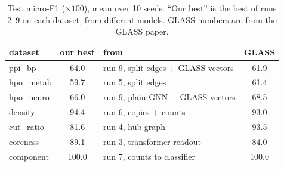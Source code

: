 \documentclass[11pt]{article}
\begin{document}
\begin{table}[H]
\centering
\small
\begin{tabular}{lclc}
\toprule
dataset & our best & from & GLASS \\
\midrule
ppi\_bp    & 64.0 & run 9, split edges + GLASS vectors & 61.9 \\
hpo\_metab & 59.7 & run 5, split edges                 & 61.4 \\
hpo\_neuro & 66.0 & run 9, plain GNN + GLASS vectors   & 68.5 \\
density    & 94.4 & run 6, copies + counts             & 93.0 \\
cut\_ratio & 81.6 & run 4, hub graph                   & 93.5 \\
coreness   & 89.1 & run 3, transformer readout         & 84.0 \\
component  & 100.0 & run 7, counts to classifier       & 100.0 \\
\bottomrule
\end{tabular}
\caption{Test micro-F1 ($\times 100$), mean over 10 seeds. ``Our best'' is the best of runs
2--9 on each dataset, from different models. GLASS numbers are from the GLASS paper.}
\end{table}
\end{document}
